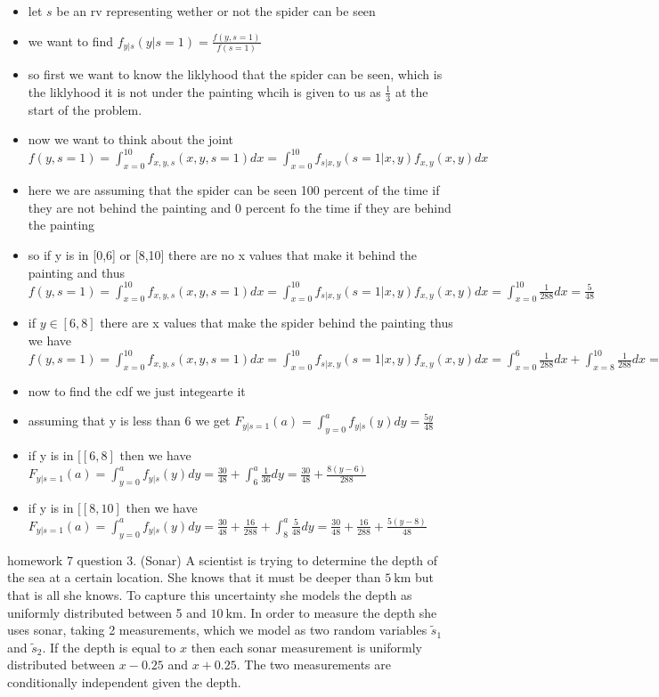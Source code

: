\documentclass[10pt]{article}
\begin{document}
\begin{itemize}
    \item let $s$ be an rv representing wether or not the spider can be seen 
    \item we want to find $f_{y|s}(y|s=1)=\frac{f(y,s=1)}{f(s=1)}$
    \item so first we want to know the liklyhood that the spider can be seen, which is the liklyhood it is not under the painting whcih is given to us as $\frac{1}{3}$ at the start of the problem. 
    \item now we want to think about the joint $f(y,s=1)=\int_{x=0}^{10}f_{x,y,s}(x,y,s=1)dx=\int_{x=0}^{10}f_{s|x,y}(s=1|x,y)f_{x,y}(x,y)dx$
    \item here we are assuming that the spider can be seen 100 percent of the time if they are not behind the painting and 0 percent fo the time if they are behind the painting 
    \item so if y is in [0,6] or [8,10] there are no x values that make it behind the painting and thus $f(y,s=1)=\int_{x=0}^{10}f_{x,y,s}(x,y,s=1)dx=\int_{x=0}^{10}f_{s|x,y}(s=1|x,y)f_{x,y}(x,y)dx=\int_{x=0}^{10}\frac{1}{288}dx=\frac{5}{48}$
    \item if $y\in [6,8]$ there are x values that make the spider behind the painting thus we have $f(y,s=1)=\int_{x=0}^{10}f_{x,y,s}(x,y,s=1)dx=\int_{x=0}^{10}f_{s|x,y}(s=1|x,y)f_{x,y}(x,y)dx=\int_{x=0}^{6}\frac{1}{288}dx+\int_{x=8}^{10}\frac{1}{288}dx=\frac{1}{36}$
    \item now to find the cdf we just integearte it 
    \item assuming that y is less than 6 we get $F_{y|s=1}(a)=\int_{y=0}^{a}f_{y|s}(y)dy=\frac{5y}{48}$
    \item if y is in $[[6,8]$ then we have $F_{y|s=1}(a)=\int_{y=0}^{a}f_{y|s}(y)dy=\frac{30}{48}+\int_{6}^{a}\frac{1}{36}dy=\frac{30}{48}+\frac{8(y-6)}{288}$
    \item  if y is in $[[8,10]$ then we have $F_{y|s=1}(a)=\int_{y=0}^{a}f_{y|s}(y)dy=\frac{30}{48}+\frac{16}{288}+\int_{8}^{a}\frac{5}{48}dy=\frac{30}{48}+\frac{16}{288}+\frac{5(y-8)}{48}$
\end{itemize}
homework 7 question 3. (Sonar) A scientist is trying to determine the depth of the sea at a certain location. She knows that it must be deeper than $5 \mathrm{~km}$ but that is all she knows. To capture this uncertainty she models the depth as uniformly distributed between 5 and $10 \mathrm{~km}$. In order to measure the depth she uses sonar, taking 2 measurements, which we model as two random variables $\tilde{s}_1$ and $\tilde{s}_2$. If the depth is equal to $x$ then each sonar measurement is uniformly distributed between $x-0.25$ and $x+0.25$. The two measurements are conditionally independent given the depth.
\end{document}
